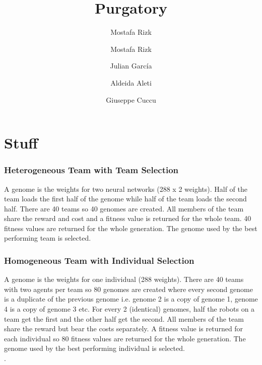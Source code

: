 \documentclass[12pt]{article}
\title{Purgatory}
\author{Mostafa Rizk}
\begin{document}
\maketitle

 \author{Mostafa Rizk}

 \author{Julian Garc\'ia}

 \author{Aldeida Aleti}
 
  \author{Giuseppe Cuccu}
 

\section{Stuff}

\subsubsection{Heterogeneous Team with Team Selection}

A genome is the weights for two neural networks (288 x 2 weights).
Half of the team loads the first half of the genome while half of the team loads the second half. 
There are 40 teams so 40 genomes are created. 
All members of the team share the reward and cost and a fitness value is returned for the whole team. 
40 fitness values are returned for the whole generation. 
The genome used by the best performing team is selected.\\

\subsubsection{Homogeneous Team with Individual Selection}

A genome is the weights for one individual (288 weights). 
There are 40 teams with two agents per team so 80 genomes are created where every second genome is a duplicate of the previous genome i.e. genome 2 is a copy of genome 1, genome 4 is a copy of genome 3 etc. 
For every 2 (identical) genomes, half the robots on a team get the first and the other half get the second. 
All members of the team share the reward but bear the costs separately. 
A fitness value is returned for each individual so 80 fitness values are returned for the whole generation. 
The genome used by the best performing individual is selected.\\. 
\end{document}
